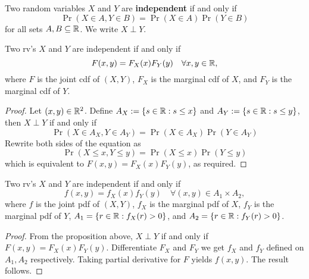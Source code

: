 \documentclass[11pt,fleqn]{book} %
\begin{document}
\begin{definition} 
Two random variables \(X\) and \(Y\) are \textbf{independent} if and only if
\[
\Pr(X \in A, Y \in B) = \Pr(X \in A)\Pr(Y \in B)
\]
for all sets \(A, B \subseteq \mathbb{R}\). We write \(X \perp Y\).
\end{definition}

\begin{proposition} Two rv's \(X\) and \(Y\) are independent if and only if
\[
F(x, y) = F_X(x)F_Y(y) \quad \forall x, y \in \mathbb{R},
\]
where \(F\) is the joint cdf of \((X, Y)\), \(F_X\) is the marginal cdf of \(X\), and \(F_Y\) is the marginal cdf of \(Y\).
\end{proposition}
\begin{proof} Let \((x, y) \in \mathbb{R}^2\). Define \(A_X := \{s \in \mathbb{R}: s \leq x\}\) and \(A_Y:= \{s \in \mathbb{R}: s \leq y\}\), then \(X \perp Y\) if and only if
\[
\Pr(X \in A_X, Y \in A_Y) = \Pr(X \in A_X)\Pr(Y \in A_Y)
\]
\indent Rewrite both sides of the equation as
\[
\Pr(X \leq x, Y \leq y) = \Pr(X \leq x)\Pr(Y \leq y)
\]
which is equivalent to \(F(x, y) = F_X(x)F_Y(y)\), as required.
\end{proof}

\begin{corollary} \label{cor:243}
Two rv's \(X\) and \(Y\) are independent if and only if
\[
f(x, y) = f_X(x)f_Y(y) \quad \forall (x, y) \in A_1 \times A_2,
\]
where \(f\) is the joint pdf of \((X, Y)\), \(f_X\) is the marginal pdf of \(X\), \(f_Y\) is the marginal pdf of \(Y\), \(A_1 = \{r \in \mathbb{R}: f_X(r) > 0\}\), and \(A_2 = \{r \in \mathbb{R}: f_Y(r) > 0\}\).
\end{corollary}
\begin{proof} From the proposition above, \(X \perp Y\) if and only if \(F(x, y) = F_X(x)F_Y(y)\). Differentiate \(F_X\) and \(F_Y\) we get \(f_X\) and \(f_Y\) defined on \(A_1, A_2\) respectively. Taking partial derivative for \(F\) yields \(f(x, y)\). The result follows.
\end{proof}
\end{document}
